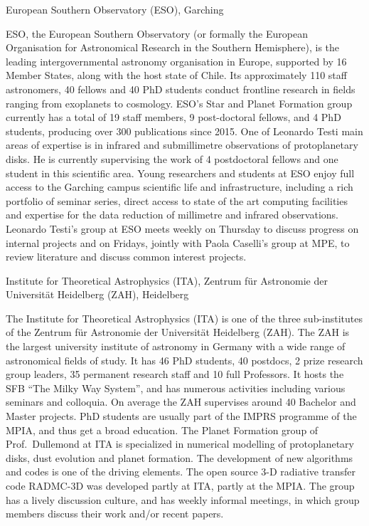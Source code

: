 \documentclass[10pt,fleqn,twoside]{article}
\begin{document}
\begin{Emphasize}
European Southern Observatory (ESO), Garching\\
\end{Emphasize}
ESO, the European Southern Observatory (or formally the European
Organisation for Astronomical Research in the Southern Hemisphere), is the
leading intergovernmental astronomy organisation in Europe, supported by 16
Member States, along with the host state of Chile. Its approximately 110
staff astronomers, 40 fellows and 40 PhD students conduct frontline research
in fields ranging from exoplanets to cosmology. ESO’s Star and Planet
Formation group currently has a total of 19 staff members, 9 post-doctoral
fellows, and 4 PhD students, producing over 300 publications since 2015. One
of Leonardo Testi main areas of expertise is in infrared and submillimetre
observations of protoplanetary disks. He is currently supervising the work
of 4 postdoctoral fellows and one student in this scientific area. Young
researchers and students at ESO enjoy full access to the Garching campus
scientific life and infrastructure, including a rich portfolio of seminar
series, direct access to state of the art computing facilities and expertise
for the data reduction of millimetre and infrared observations. Leonardo
Testi’s group at ESO meets weekly on Thursday to discuss progress on
internal projects and on Fridays, jointly with Paola Caselli’s group at MPE,
to review literature and discuss common interest projects.
\vspace{1em}

\begin{Emphasize}
Institute for Theoretical Astrophysics (ITA), 
Zentrum f\"ur Astronomie der Universit\"at Heidelberg (ZAH), Heidelberg\\
\end{Emphasize}
The Institute for Theoretical Astrophysics (ITA) is one of the three
sub-institutes of the Zentrum f\"ur Astronomie der Universit\"at Heidelberg
(ZAH).  The ZAH is the largest university institute of astronomy in Germany
with a wide range of astronomical fields of study. It has 46 PhD students,
40 postdocs, 2 prize research group leaders, 35 permanent research staff and
10 full Professors. It hosts the SFB ``The Milky Way System'', and has 
numerous activities including various seminars and colloquia. On average
the ZAH supervises around 40 Bachelor and Master projects. PhD students 
are usually part of the IMPRS programme of the MPIA, and thus get a broad
education. The Planet Formation group of Prof.~Dullemond at ITA is specialized
in numerical modelling of protoplanetary disks, dust evolution and 
planet formation. The development of new algorithms and codes is one of the
driving elements. The open source 3-D radiative transfer code {\sc RADMC-3D}
was developed partly at ITA, partly at the MPIA. The group has a lively
discussion culture, and has weekly informal meetings, in which group members 
discuss their work and/or recent papers.
\vspace{1em}
\end{document}
